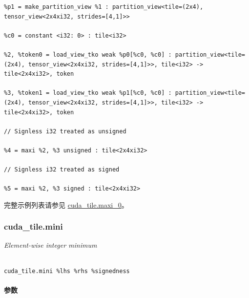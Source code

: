 \documentclass{article}
\begin{document}
\begin{itemize}
\begin{lstlisting}
%p1 = make_partition_view %1 : partition_view<tile=(2x4), tensor_view<2x4xi32, strides=[4,1]>>

%c0 = constant <i32: 0> : tile<i32>

%2, %token0 = load_view_tko weak %p0[%c0, %c0] : partition_view<tile=(2x4), tensor_view<2x4xi32, strides=[4,1]>>, tile<i32> -> tile<2x4xi32>, token

%3, %token1 = load_view_tko weak %p1[%c0, %c0] : partition_view<tile=(2x4), tensor_view<2x4xi32, strides=[4,1]>>, tile<i32> -> tile<2x4xi32>, token

// Signless i32 treated as unsigned

%4 = maxi %2, %3 unsigned : tile<2x4xi32>

// Signless i32 treated as signed

%5 = maxi %2, %3 signed : tile<2x4xi32>

\end{lstlisting}



\end{itemize}
完整示例列表请参见 \href{https://docs.nvidia.com/cuda/tile-ir/latest/sections/appendix.html#example-cuda-tile-maxi-0}{cuda\_tile.maxi\_0}。





\subsubsection{cuda\_tile.mini}


\textit{Element-wise integer minimum}




\begin{lstlisting}

cuda_tile.mini %lhs %rhs %signedness

\end{lstlisting}



\paragraph{参数}
\end{document}
